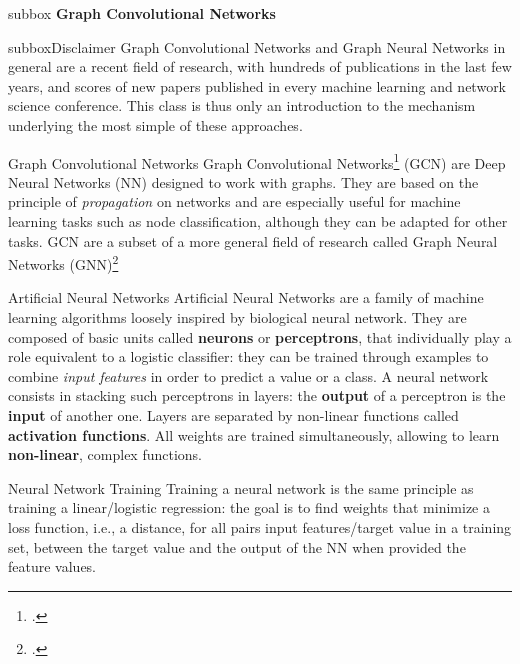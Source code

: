 \documentclass[a4paper,11pt]{book}
\begin{document}

\newpage



\begin{subbox}{subbox}{}
\centering
\Large{\textbf{Graph Convolutional Networks}}
\end{subbox}

\begin{subbox}{subbox}{Disclaimer}
Graph Convolutional Networks and Graph Neural Networks in general are a recent field of research, with hundreds of publications in the last few years, and scores of new papers published in every machine learning and network science conference. This class is thus only an introduction to the mechanism underlying the most simple of these approaches.
\end{subbox}


\begin{textbox}{Graph Convolutional Networks}
Graph Convolutional Networks\footcite{zhang2019graph} (GCN) are Deep Neural Networks (NN) designed to work with graphs. They are based on the principle of \textit{propagation} on networks and are especially useful for machine learning tasks such as node classification, although they can be adapted for other tasks. GCN are a subset of a more general field of research called Graph Neural Networks (GNN)\footcite{wu2020comprehensive}
\end{textbox}

\begin{textbox}{Artificial Neural Networks}
Artificial Neural Networks are a family of machine learning algorithms loosely inspired by biological neural network. They are composed of basic units called \textbf{neurons} or \textbf{perceptrons}, that individually play a role equivalent to a logistic classifier: they can be trained through examples to combine \textit{input features} in order to predict a value or a class. A neural network consists in stacking such perceptrons in layers: the \textbf{output} of a perceptron is the \textbf{input} of another one. Layers are separated by non-linear functions called \textbf{activation functions}. All weights are trained simultaneously, allowing to learn \textbf{non-linear}, complex functions.
\end{textbox}

\begin{textbox}{Neural Network Training}
Training a neural network is the same principle as training a linear/logistic regression: the goal is to find weights that minimize a loss function, i.e., a distance, for all pairs input features/target value in a training set, between the target value and the output of the NN when provided the feature values.
\end{textbox}
\end{document}

